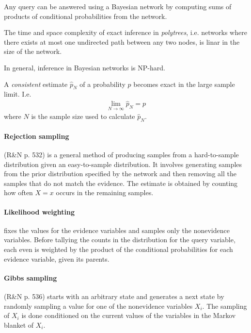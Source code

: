 \documentclass{article}
\begin{document}
\begin{theorem}[R\&N p. 523]
	Any query can be answered using a Bayesian network by computing sums of products of
	conditional probabilities from the network.
\end{theorem}

\begin{theorem}
	The time and space complexity of exact inference in \emph{polytrees}, i.e. networks where there exists at most one
	undirected path between any two nodes, is linar in the size of the network.

	In general, inference in Bayesian networks is NP-hard.
\end{theorem}

\begin{definition}
	A \emph{consistent} estimate $\hat p_N$ of a probability $p$ becomes exact in the large sample limit. I.e.
	\begin{align*}
		\lim_{N\to\infty} \hat p_N = p
	\end{align*}
	where $N$ is the sample size used to calculate $\hat p_N$.
\end{definition}

\paragraph{Rejection sampling} (R\&N p. 532) is a general method of producing samples from a hard-to-sample
distribution given an easy-to-sample distribution. It involves generating samples from the
prior distribution specified by the network and then removing all the samples that do not
match the evidence. The estimate is obtained by counting how often $X=x$ occurs in the remaining
samples.

\paragraph{Likelihood weighting} fixes the values for the evidence variables and samples
only the nonevidence variables. Before tallying the counts in the distribution for the query
variable, each even is weighted by the product of the conditional probabilities for each evidence
variable, given its parents.

\paragraph{Gibbs sampling} (R\&N p. 536) starts with an arbitrary state and generates a next state by randomly
sampling a value for one of the nonevidence variables $X_i$. The sampling of $X_i$ is done
conditioned on the current values of the variables in the Markov blanket of $X_i$.
\end{document}
